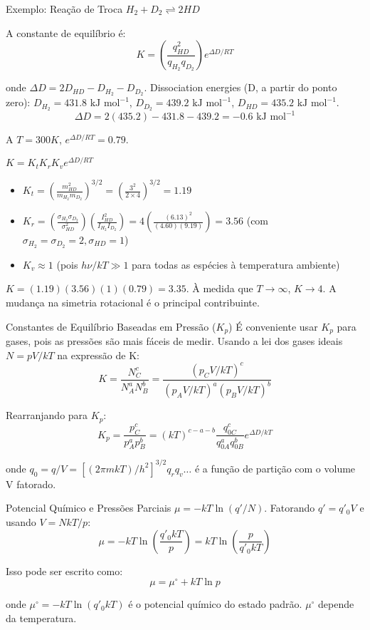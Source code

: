 \documentclass{beamer}
\begin{document}
\begin{frame}{Exemplo: Reação de Troca $H_2 + D_2 \rightleftharpoons 2HD$}
    
    A constante de equilíbrio é:
    $$ K = \left(\frac{q_{HD}^2}{q_{H_2}q_{D_2}}\right) e^{\Delta D/RT} $$
    
    onde $\Delta D = 2D_{HD} - D_{H_2} - D_{D_2}$.  
    Dissociation energies (D, a partir do ponto zero): $D_{H_2} = 431.8 \text{ kJ mol}^{-1}$, $D_{D_2} = 439.2 \text{ kJ mol}^{-1}$, $D_{HD} = 435.2 \text{ kJ mol}^{-1}$. 
    $$ \Delta D = 2(435.2) - 431.8 - 439.2 = -0.6 \text{ kJ mol}^{-1} $$
    
    A $T=300K$, $e^{\Delta D/RT} = 0.79$.  

    $K = K_t K_r K_v e^{\Delta D/RT}$
    \begin{itemize}
        \item $K_t = \left(\frac{m_{HD}^2}{m_{H_2}m_{D_2}}\right)^{3/2} = \left(\frac{3^2}{2 \times 4}\right)^{3/2} = 1.19$ 
        \item $K_r = \left(\frac{\sigma_{H_2}\sigma_{D_2}}{\sigma_{HD}^2}\right) \left(\frac{I_{HD}^2}{I_{H_2}I_{D_2}}\right) = 4 \left(\frac{(6.13)^2}{(4.60)(9.19)}\right) = 3.56$ (com $\sigma_{H_2}=\sigma_{D_2}=2, \sigma_{HD}=1$) 
        \item $K_v \approx 1$ (pois $h\nu/kT \gg 1$ para todas as espécies à temperatura ambiente) 
    \end{itemize}
    
    $ K = (1.19)(3.56)(1)(0.79) = 3.35 $. 
    À medida que $T \rightarrow \infty$, $K \rightarrow 4$. A mudança na simetria rotacional é o principal contribuinte. 
\end{frame}

\begin{frame}{Constantes de Equilíbrio Baseadas em Pressão ($K_p$)}
    É conveniente usar $K_p$ para gases, pois as pressões são mais fáceis de medir. 
    Usando a lei dos gases ideais $N = pV/kT$ na expressão de K:
    $$ K = \frac{N_C^c}{N_A^a N_B^b} = \frac{(p_C V/kT)^c}{(p_A V/kT)^a (p_B V/kT)^b} $$
     
    Rearranjando para $K_p$:
    $$ K_p = \frac{p_C^c}{p_A^a p_B^b} = (kT)^{c-a-b} \frac{q_{0C}^c}{q_{0A}^a q_{0B}^b} e^{\Delta D/kT} $$
    
    onde $q_0 = q/V = [(2\pi mkT)/h^2]^{3/2} q_r q_v \dots$ é a função de partição com o volume V fatorado.  

    \begin{block}{Potencial Químico e Pressões Parciais}
        $\mu = -kT \ln(q'/N)$. Fatorando $q' = q'_0 V$ e usando $V=NkT/p$:
        $$ \mu = -kT \ln\left(\frac{q'_0 kT}{p}\right) = kT \ln\left(\frac{p}{q'_0 kT}\right) $$
        
        Isso pode ser escrito como:
        $$ \mu = \mu^{\circ} + kT \ln p $$
        
        onde $\mu^{\circ} = -kT \ln(q'_0 kT)$ é o potencial químico do estado padrão.  $\mu^{\circ}$ depende da temperatura. 
    \end{block}
\end{frame}
\end{document}
